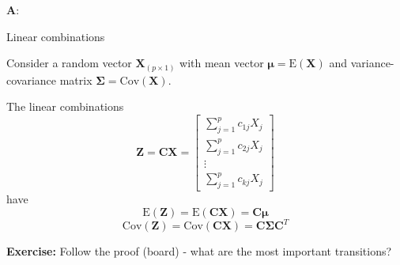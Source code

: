 \documentclass[
  ignorenonframetext,
]{beamer}
\begin{document}
\begin{frame}
\textbf{A}:
\end{frame}

\begin{frame}
\begin{block}{Linear combinations}
\protect\hypertarget{linear-combinations}{}
\(~\)

Consider a random vector \(\boldsymbol{X}_{(p\times 1)}\) with mean
vector \(\boldsymbol{\mu}=\text{E}(\boldsymbol{X})\) and
variance-covariance matrix
\(\boldsymbol\Sigma=\text{Cov}(\boldsymbol{X})\).

The linear combinations
\[\boldsymbol{Z}=\boldsymbol{C}\boldsymbol{X}=\left[ \begin{array}{c} \sum_{j=1}^p c_{1j}X_j\\ \sum_{j=1}^p c_{2j}X_j\\ \vdots \\ \sum_{j=1}^p c_{kj}X_j \end{array} \right]\]
have
\[\text{E}(\boldsymbol{Z})=\text{E}(\boldsymbol{C}\boldsymbol{X})=\boldsymbol{C}\boldsymbol{\mu}\]
\[\text{Cov}(\boldsymbol{Z})=\text{Cov}(\boldsymbol{C}\boldsymbol{X})=
   \boldsymbol{C}\boldsymbol\Sigma\boldsymbol{C}^T\]

\textbf{Exercise:} Follow the proof (board) - what are the most
important transitions?
\end{block}
\end{frame}
\end{document}
